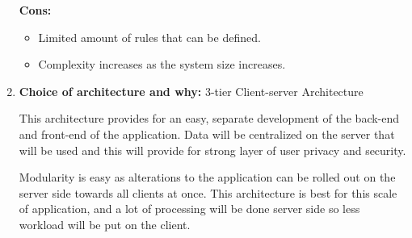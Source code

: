 \documentclass{article}
\begin{document}
\begin{enumerate}
		\textbf{Cons:}
		\begin{itemize}
			\item Limited amount of rules that can be defined.
			\item Complexity increases as the system size increases.	\newline\newline			
		\end{itemize}
		
		
		
		
		
		
		
		
		
		\newline\newline
		
		\item \textbf{Choice of architecture and why:} 3-tier Client-server Architecture
		\begin{flushleft}
			
			This architecture provides for an easy, separate development of the back-end and front-end of the application.
			Data will be centralized on the server that will be used and this will provide for strong layer of user privacy
			and security. 
			
			Modularity is easy as alterations to the application can be rolled out on the server side towards
			all clients at once. This architecture is best for this scale of application, and a lot of processing will be done
			server side so less workload will be put on the client. 
			
		\end{flushleft}
	\end{enumerate}
	
\end{document}
